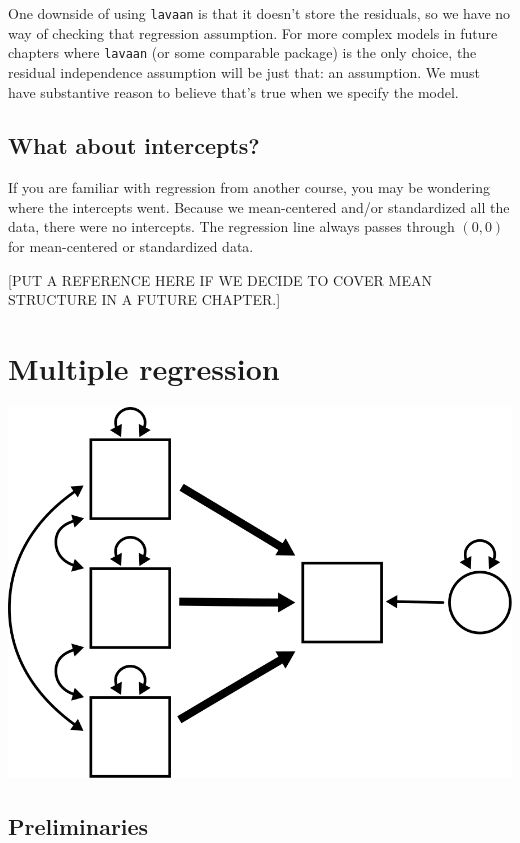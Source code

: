 \documentclass[
]{book}
\begin{document}
One downside of using \texttt{lavaan} is that it doesn't store the residuals, so we have no way of checking that regression assumption. For more complex models in future chapters where \texttt{lavaan} (or some comparable package) is the only choice, the residual independence assumption will be just that: an assumption. We must have substantive reason to believe that's true when we specify the model.

\hypertarget{simple-intercepts}{%
\section{What about intercepts?}\label{simple-intercepts}}

If you are familiar with regression from another course, you may be wondering where the intercepts went. Because we mean-centered and/or standardized all the data, there were no intercepts. The regression line always passes through \((0, 0)\) for mean-centered or standardized data.

{[}PUT A REFERENCE HERE IF WE DECIDE TO COVER MEAN STRUCTURE IN A FUTURE CHAPTER.{]}

\hypertarget{multiple}{%
\chapter{Multiple regression}\label{multiple}}

\begin{center}\includegraphics{graphics/multiple_regression} \end{center}

\hypertarget{preliminaries-1}{%
\section*{Preliminaries}\label{preliminaries-1}}
\end{document}
